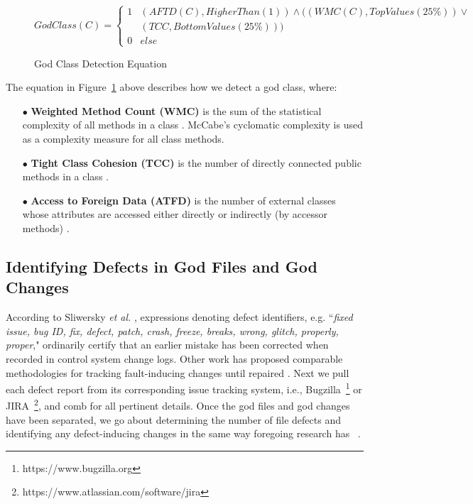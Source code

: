 \begin{figure}[h]
\[GodClass(C) = \left\{\begin{matrix}
1& (AFTD(C), HigherThan(1))  \wedge ((WMC(C), TopValues(25\%)) \vee \\ 
 & (TCC, BottomValues(25\%)))\\ 
0& else
\end{matrix}\right.\]
\captionsetup[figure]{list=no}
\caption{God Class Detection Equation}
\label{equation:1}
\end{figure}

The equation in Figure~\ref{equation:1} above describes how we detect a god class, where:


\begin{itemize}
\item[$\bullet$] \textbf{Weighted Method Count (WMC)} is the sum of the statistical complexity of all methods in a class \cite{Chidamber_Kemerer_94}. McCabe's cyclomatic complexity \cite{McCabe_1976} is used as a complexity measure for all class methods.
\item[$\bullet$] \textbf{Tight Class Cohesion (TCC)} is the number of directly connected public methods in a class \cite{Bieman:1995:CRO:223427.211856}.
\item[$\bullet$] \textbf{Access to Foreign Data (ATFD)} is the number of external classes whose attributes are accessed either directly or indirectly (by accessor methods) \cite{Marinescu_PhD}.
\end{itemize}

\subsection{Identifying Defects in God Files and God Changes}
\label{ch4_bugs_td}

According to Sliwersky \textit{et al.} \cite{sliwerski-msr-2005}, expressions denoting defect identifiers, e.g. ``\textit{fixed issue, bug ID, fix, defect, patch, crash, freeze, breaks, wrong, glitch, properly, proper}," ordinarily certify that an earlier mistake has been corrected when recorded in control system change logs. Other work has proposed comparable methodologies for tracking fault-inducing changes until repaired \cite{Kamei-tse-2013, Kim-tse-2008, sliwerski-msr-2005}. Next we pull each defect report from its corresponding issue tracking system, i.e., Bugzilla~\footnote{https://www.bugzilla.org} or JIRA~\footnote{https://www.atlassian.com/software/jira}, and comb for all pertinent details. Once the god files and god changes have been separated, we go about determining the number of file defects and identifying any defect-inducing changes in the same way foregoing research has ~\cite{Kamei-tse-2013, Kim-tse-2008, sliwerski-msr-2005}.

